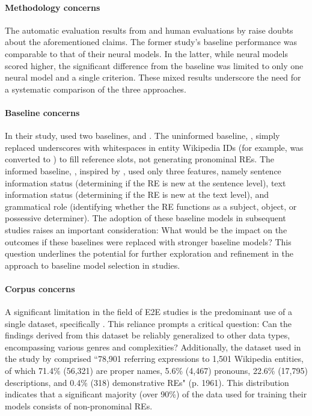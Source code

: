 \paragraph*{Methodology concerns}

The automatic evaluation results from \citet{cunha-etal-2020-referring} and human evaluations by \citet{ferreira2018neuralreg} raise doubts about the aforementioned claims. The former study's baseline performance was comparable to that of their neural models. In the latter, while neural models scored higher, the significant difference from the baseline was limited to only one neural model and a single criterion. These mixed results underscore the need for a systematic comparison of the three approaches.

\paragraph*{Baseline concerns}

In their study, \citet{ferreira2018neuralreg} used two baselines,  and . The uninformed baseline, , simply replaced underscores with whitespaces in entity Wikipedia IDs (for example,  was converted to ) to fill reference slots, not generating pronominal REs. The informed baseline, , inspired by \citet{castro-ferreira-etal-2016-towards-variation}, used only three features, namely sentence information status (determining if the RE is new at the sentence level), text information status  (determining if the RE is new at the text level), and grammatical role (identifying whether the RE functions as a subject, object, or possessive determiner). The adoption of these baseline models in subsequent studies raises an important consideration: What would be the impact on the outcomes if these baselines were replaced with stronger baseline models? This question underlines the potential for further exploration and refinement in the approach to baseline model selection in \context studies.

\paragraph*{Corpus concerns}

A significant limitation in the field of E2E \context studies is the predominant use of a single dataset, specifically \webnlg. This reliance prompts a critical question: Can the findings derived from this dataset be reliably generalized to other data types, encompassing various genres and complexities? Additionally, the \webnlg dataset used in the study by \citet{ferreira2018neuralreg} comprised ``78,901 referring expressions to 1,501 Wikipedia entities, of which 71.4\% (56,321) are proper names, 5.6\% (4,467) pronouns, 22.6\% (17,795) descriptions, and 0.4\% (318) demonstrative REs" (p. 1961). This distribution indicates that a significant majority (over 90\%) of the data used for training their models consists of non-pronominal REs.

